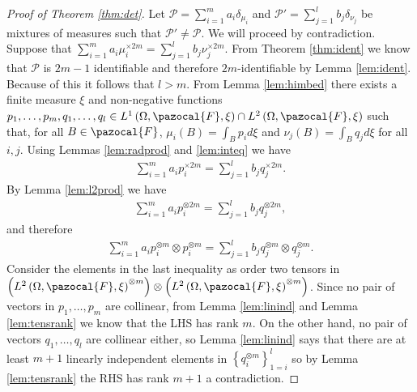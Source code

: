 \documentclass[aos]{imsart}
\def\sF{\pazocal{F}}
\def\sP{\mathscr{P}}
\theoremstyle{plain}
\theoremstyle{defintion}
\begin{document}
	\begin{proof}[Proof of Theorem \ref{thm:det}]
		Let $\sP = \sum_{i=1}^m a_i \delta_{\mu_i}$ and $\sP' = \sum_{j=1}^{l}  b_j \delta_{\nu_j}$ be mixtures of measures such that $\sP' \neq \sP$. We will proceed by contradiction. Suppose that $\sum_{i=1}^m  a_i \mu_i^{\times 2m} = \sum_{j=1}^l b_j \nu_j^{\times 2m} $. From Theorem \ref{thm:ident} we know that $\sP$ is $2m-1$ identifiable and therefore $2m$-identifiable by Lemma \ref{lem:ident}. Because of this it follows that $l>m$. From Lemma \ref{lem:himbed} there exists a finite measure $\xi$ and non-negative functions $p_1,\ldots,p_m,q_1,\ldots,q_l \in L^1\left( \Omega, \sF, \xi \right)\cap L^2\left( \Omega, \sF, \xi \right)$ such that, for all $B\in \sF$, $\mu_i(B) = \int_B p_i d\xi$ and $\nu_j(B) = \int_B q_j d\xi$ for all $i,j$. Using Lemmas \ref{lem:radprod} and \ref{lem:inteq} we have
		\begin{eqnarray*}
			\sum_{i=1}^m a_i p_i^{\times 2m} = \sum_{j=1}^l b_j q_j^{\times 2m}.
		\end{eqnarray*}
		By Lemma \ref{lem:l2prod} we have
		\begin{eqnarray*}
			\sum_{i=1}^m a_i p_i^{\otimes 2m} = \sum_{j=1}^l b_j q_j^{\otimes 2m},
		\end{eqnarray*}
		and therefore
		\begin{eqnarray*}
			\sum_{i=1}^m a_i p_i^{\otimes m}\otimes p_i^{\otimes m} = \sum_{j=1}^l b_j q_j^{\otimes m}\otimes q_j^{\otimes m}.
		\end{eqnarray*}
		Consider the elements in the last inequality as order two tensors in $\left( {L^2\left( \Omega, \sF, \xi \right)}^{\otimes m} \right)\otimes \left( {L^2\left( \Omega, \sF, \xi \right)}^{ \otimes m} \right)$. Since no pair of vectors in $p_1,\ldots,p_m$ are collinear, from Lemma \ref{lem:linind} and Lemma \ref{lem:tensrank} we know that the LHS has rank $m$. On the other hand, no pair of vectors $q_1,\ldots,q_l$ are collinear either, so Lemma \ref{lem:linind} says that there are at least $m+1$ linearly independent elements in $\left\{q_i^{\otimes m}\right\}_{1=i}^l$ so by Lemma \ref{lem:tensrank} the RHS has rank $m+1$ a contradiction.
	\end{proof}
\end{document}
